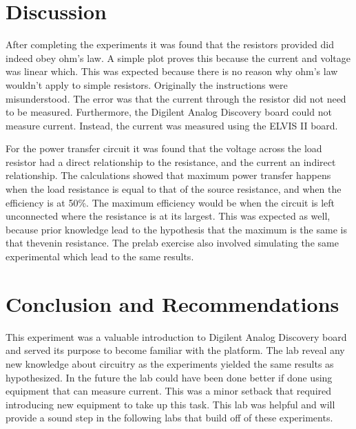 \section{Discussion}
\label{sec:Discussion}
After completing the experiments it was found that the resistors
provided did indeed obey ohm's law. A simple plot proves this because
the current and voltage was linear which. This was expected because there
is no reason why ohm's law wouldn't apply to simple resistors. Originally
the instructions were misunderstood. The error was that the current through the
resistor did not need to be measured. Furthermore, the Digilent Analog
Discovery board could not measure current. Instead, the current was measured
using the ELVIS II board.

For the power transfer circuit it was found that the voltage across
the load resistor had a direct relationship to the resistance, and the current an indirect
relationship. The calculations showed that maximum power transfer happens when the
load resistance is equal to that of the source resistance, and when the efficiency is at 50\%.
The maximum efficiency would be when the circuit is left unconnected where the resistance is
at its largest. This was expected as well, because prior knowledge lead to the
hypothesis that the maximum is the same is that thevenin resistance. The prelab
exercise also involved simulating the same experimental which lead to the same
results.

\section{Conclusion and Recommendations}
\label{sec:Conclusion}
This experiment was a valuable introduction to Digilent Analog Discovery board
and served its purpose to become familiar with the platform. The lab reveal any
new knowledge about circuitry as the experiments yielded the same results as
hypothesized. In the future the lab could have been done better if done using
equipment that can measure current. This was a minor setback that required
introducing new equipment to take up this task. This lab was helpful and will
provide a sound step in the following labs that build off of these experiments.
